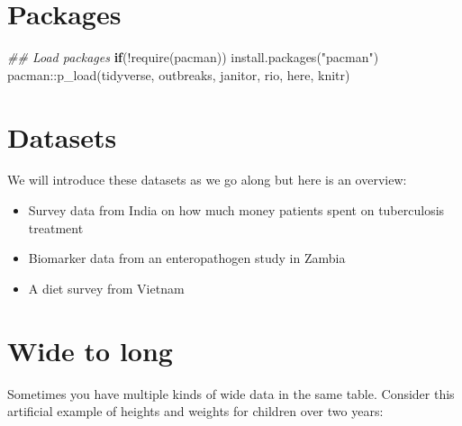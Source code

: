 \documentclass[
  letterpaper,
  DIV=11,
  numbers=noendperiod]{scrreprt}
\newenvironment{Shaded}{\begin{snugshade}}{\end{snugshade}}
\newcommand{\ControlFlowTok}[1]{\textcolor[rgb]{0.00,0.23,0.31}{\textbf{#1}}}
\newcommand{\DocumentationTok}[1]{\textcolor[rgb]{0.37,0.37,0.37}{\textit{#1}}}
\newcommand{\FunctionTok}[1]{\textcolor[rgb]{0.28,0.35,0.67}{#1}}
\newcommand{\NormalTok}[1]{\textcolor[rgb]{0.00,0.23,0.31}{#1}}
\newcommand{\SpecialCharTok}[1]{\textcolor[rgb]{0.37,0.37,0.37}{#1}}
\newcommand{\StringTok}[1]{\textcolor[rgb]{0.13,0.47,0.30}{#1}}
\begin{document}
\section{Packages}\label{packages-8}

\begin{Shaded}
\begin{Highlighting}[]
\DocumentationTok{\#\# Load packages }
\ControlFlowTok{if}\NormalTok{(}\SpecialCharTok{!}\FunctionTok{require}\NormalTok{(pacman)) }\FunctionTok{install.packages}\NormalTok{(}\StringTok{"pacman"}\NormalTok{)}
\NormalTok{pacman}\SpecialCharTok{::}\FunctionTok{p\_load}\NormalTok{(tidyverse, outbreaks, janitor, rio, here, knitr)}
\end{Highlighting}
\end{Shaded}

\section{Datasets}\label{datasets-3}

We will introduce these datasets as we go along but here is an overview:

\begin{itemize}
\item
  Survey data from India on how much money patients spent on
  tuberculosis treatment
\item
  Biomarker data from an enteropathogen study in Zambia
\item
  A diet survey from Vietnam
\end{itemize}

\section{Wide to long}\label{wide-to-long}

Sometimes you have multiple kinds of wide data in the same table.
Consider this artificial example of heights and weights for children
over two years:
\end{document}
